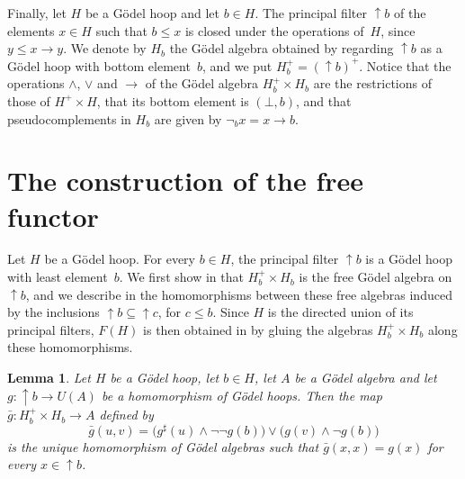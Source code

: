 \documentclass[reqno,a4paper]{amsart}
\theoremstyle{plain}
\newtheorem{lemma}[subsection]{Lemma}
\theoremstyle{definition}
\theoremstyle{remark}
\numberwithin{equation}{section}
\newcommand{\up}{{\uparrow}}
\begin{document}
Finally, let $H$ be a G\"odel hoop and let $b\in H$. The principal filter ${\up}b$ of the elements $x\in H$ such that $b\leq x$ is closed under the operations of~$H$, since $y\leq x\to y$. We denote by $H_b$ the G\"odel algebra obtained by regarding ${\up}b$ as a G\"odel hoop with bottom element~$b$, and we put $H_b^+=({\up}b)^+$. Notice that the operations $\wedge$, $\vee$ and $\to$ of the G\"odel algebra $H_b^+\times H_b$ are the restrictions of those of $H^+\times H$, that its bottom element is $(\bot,b)$, and that pseudocomplements in $H_b$ are given by $\neg_b x=x\to b$.

\section{The construction of the free functor}\label{SecFree}

Let $H$ be a G\"odel hoop. For every $b\in H$, the principal filter ${\up}b$ is a G\"odel hoop with least element~$b$. We first show in  that $H_b^+\times H_b$ is the free G\"odel algebra on~${\up}b$, and we describe in  the homomorphisms between these free algebras induced by the inclusions ${\up}b\subseteq{\up}c$, for $c\leq b$. Since $H$ is the directed union of its principal filters, $F(H)$ is then obtained in  by gluing the algebras $H_b^+\times H_b$ along these homomorphisms.

\begin{lemma}\label{LemExtension}
Let $H$ be a G\"odel hoop, let $b\in H$, let $A$ be a G\"odel algebra and let $g\colon{\up}b\to U(A)$ be a homomorphism of G\"odel hoops. Then the map $\bar g\colon H_b^+\times H_b\to A$ defined by
\begin{equation}\label{EqExtension}
\bar g(u,v)=\bigl(g^\sharp(u)\wedge\neg\neg g(b)\bigr)\vee\bigl(g(v)\wedge\neg g(b)\bigr)
\end{equation}
is the unique homomorphism of G\"odel algebras such that $\bar g(x,x)=g(x)$ for every $x\in{\up}b$.
\end{lemma}
\end{document}

